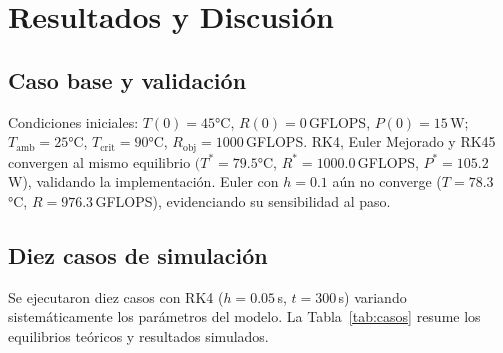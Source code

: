 \documentclass[10pt, twocolumn]{article}
\begin{document}
\section{Resultados y Discusión}
\label{sec:resultados}

\subsection{Caso base y validación}

Condiciones iniciales: $T(0)=45$°C, $R(0)=0$\,GFLOPS, $P(0)=15$\,W;
$T_\text{amb}=25$°C, $T_\text{crit}=90$°C, $R_\text{obj}=1000$\,GFLOPS.
RK4, Euler Mejorado y RK45 convergen al mismo equilibrio
$(T^*=79.5$°C, $R^*=1000.0$\,GFLOPS, $P^*=105.2$\,W), validando la
implementación. Euler con $h=0.1$ aún no converge ($T=78.3$°C,
$R=976.3$\,GFLOPS), evidenciando su sensibilidad al paso.

\subsection{Diez casos de simulación}

Se ejecutaron diez casos con RK4 ($h=0.05$\,s, $t=300$\,s) variando
sistemáticamente los parámetros del modelo. La Tabla~\ref{tab:casos}
resume los equilibrios teóricos y resultados simulados.
\end{document}
